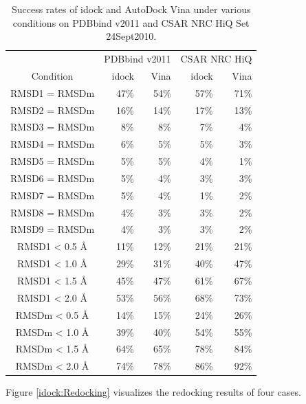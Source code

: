 \begin{table}
\centering
\begin{tabular*}
{\linewidth}
{@{\extracolsep{\fill}}crrrr}
\toprule
& \multicolumn{2}{c}{PDBbind v2011} & \multicolumn{2}{c}{CSAR NRC HiQ}\\
Condition & idock & Vina & idock & Vina\\
\midrule
RMSD1 = RMSDm   & 47\% & 54\% & 57\% & 71\%\\
RMSD2 = RMSDm   & 16\% & 14\% & 17\% & 13\%\\
RMSD3 = RMSDm   &  8\% &  8\% &  7\% &  4\%\\
RMSD4 = RMSDm   &  6\% &  5\% &  5\% &  3\%\\
RMSD5 = RMSDm   &  5\% &  5\% &  4\% &  1\%\\
RMSD6 = RMSDm   &  5\% &  4\% &  3\% &  3\%\\
RMSD7 = RMSDm   &  5\% &  4\% &  1\% &  2\%\\
RMSD8 = RMSDm   &  4\% &  3\% &  3\% &  2\%\\
RMSD9 = RMSDm   &  4\% &  3\% &  3\% &  2\%\\
RMSD1 < 0.5 \AA & 11\% & 12\% & 21\% & 21\%\\
RMSD1 < 1.0 \AA & 29\% & 31\% & 40\% & 47\%\\
RMSD1 < 1.5 \AA & 45\% & 47\% & 61\% & 67\%\\
RMSD1 < 2.0 \AA & 53\% & 56\% & 68\% & 73\%\\
RMSDm < 0.5 \AA & 14\% & 15\% & 24\% & 26\%\\
RMSDm < 1.0 \AA & 39\% & 40\% & 54\% & 55\%\\
RMSDm < 1.5 \AA & 64\% & 65\% & 78\% & 84\%\\
RMSDm < 2.0 \AA & 74\% & 78\% & 86\% & 92\%\\
\bottomrule
\end{tabular*}
\caption{Success rates of idock and AutoDock Vina under various conditions on PDBbind v2011 and CSAR NRC HiQ Set 24Sept2010.}
\label{idock:SuccessRate}
\end{table}

Figure \ref{idock:Redocking} visualizes the redocking results of four cases.

